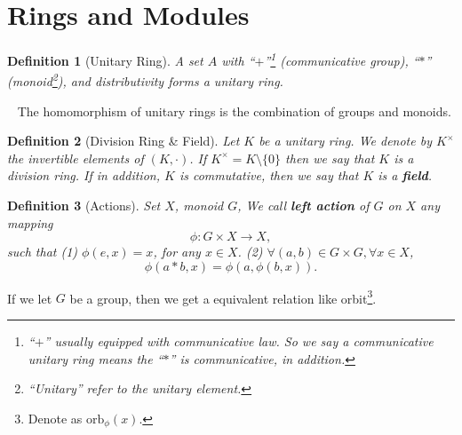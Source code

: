\documentclass{article}
\theoremstyle{1}
\newtheorem{definition}{Definition}[section]
\begin{document}
\section{Rings and Modules}
\begin{definition}[Unitary Ring]
    A set $A$ with ``$+$''\footnote{``$+$'' usually equipped with communicative law. So we say a communicative unitary ring means the ``$*$'' is communicative, in addition.} (communicative group), ``$*$'' (monoid\footnote{``Unitary'' refer to the unitary element.}), and distributivity forms a unitary ring.
\end{definition}
\ \newline
The homomorphism of unitary rings is the combination of groups and monoids.
\begin{definition}[Division Ring \& Field]
    Let $K$ be a unitary ring. We denote by $K^\times$ the invertible elements of $(K, \cdot)$. If $K^\times=K\setminus\{0\}$ then we say that $K$ is a division ring. If in addition,  $K$ is commutative,  then we say that $K$ is a \textbf{field}.
\end{definition}
\begin{definition}[Actions]
    Set $X$, monoid $G$, We call \textbf{left action} of $G$ on $X$ any mapping 
    $$\phi:G\times X\rightarrow X, $$
    such that 
    \newline
    (1) $\phi(e, x)=x$,  for any $x\in X$.
    \newline
    (2) $\forall (a, b)\in G\times G, \forall x\in X$, 
    $$\phi(a*b, x)=\phi(a, \phi(b, x)).$$
\end{definition}
If we let $G$ be a group, then we get a equivalent relation like orbit\footnote{Denote as $\mathrm{orb}_\phi(x)$.}.
\end{document}
